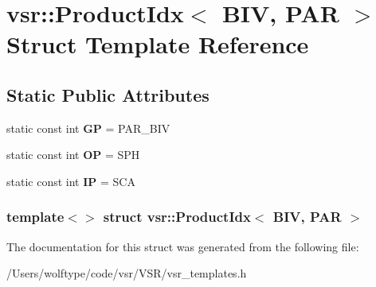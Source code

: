 \hypertarget{structvsr_1_1_product_idx_3_01_b_i_v_00_01_p_a_r_01_4}{\section{vsr\-:\-:Product\-Idx$<$ B\-I\-V, P\-A\-R $>$ Struct Template Reference}
\label{structvsr_1_1_product_idx_3_01_b_i_v_00_01_p_a_r_01_4}
}
\subsection*{Static Public Attributes}
\begin{DoxyCompactItemize}
\item 
\hypertarget{structvsr_1_1_product_idx_3_01_b_i_v_00_01_p_a_r_01_4_aef2c0fd332139d64fa322d53341d3de8}{static const int {\bfseries G\-P} = P\-A\-R\-\_\-\-B\-I\-V}\label{structvsr_1_1_product_idx_3_01_b_i_v_00_01_p_a_r_01_4_aef2c0fd332139d64fa322d53341d3de8}

\item 
\hypertarget{structvsr_1_1_product_idx_3_01_b_i_v_00_01_p_a_r_01_4_a623d0405baa98e11a8cb97e89100278a}{static const int {\bfseries O\-P} = S\-P\-H}\label{structvsr_1_1_product_idx_3_01_b_i_v_00_01_p_a_r_01_4_a623d0405baa98e11a8cb97e89100278a}

\item 
\hypertarget{structvsr_1_1_product_idx_3_01_b_i_v_00_01_p_a_r_01_4_a274f1c31c5e03cd2979b731eb6b4f818}{static const int {\bfseries I\-P} = S\-C\-A}\label{structvsr_1_1_product_idx_3_01_b_i_v_00_01_p_a_r_01_4_a274f1c31c5e03cd2979b731eb6b4f818}

\end{DoxyCompactItemize}
\subsubsection*{template$<$$>$ struct vsr\-::\-Product\-Idx$<$ B\-I\-V, P\-A\-R $>$}



The documentation for this struct was generated from the following file\-:\begin{DoxyCompactItemize}
\item 
/\-Users/wolftype/code/vsr/\-V\-S\-R/vsr\-\_\-templates.\-h\end{DoxyCompactItemize}
